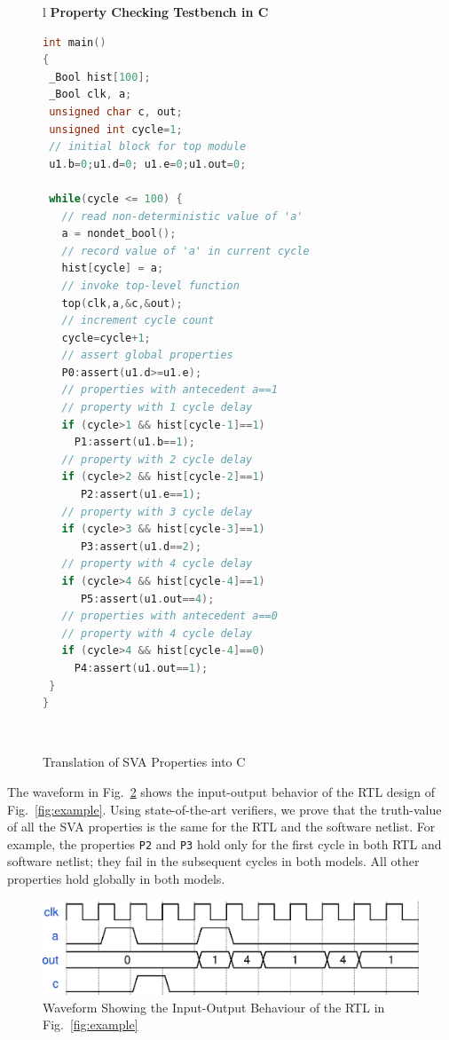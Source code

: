 \begin{figure}[t]
\small
\begin{center}
\begin{tabular}{l}
\hline\noalign{\vskip0.25ex}
\textbf{Property Checking Testbench in C} \\
\hline
\begin{lstlisting}[boxpos=t,mathescape=true,language=C,basicstyle=\scriptsize\ttfamily]
int main() 
{
 _Bool hist[100];
 _Bool clk, a;
 unsigned char c, out;
 unsigned int cycle=1;
 // initial block for top module
 u1.b=0;u1.d=0; u1.e=0;u1.out=0; 
 
 while(cycle <= 100) {
   // read non-deterministic value of 'a'
   a = nondet_bool(); 
   // record value of 'a' in current cycle
   hist[cycle] = a;
   // invoke top-level function
   top(clk,a,&c,&out);
   // increment cycle count
   cycle=cycle+1; 
   // assert global properties 
   P0:assert(u1.d>=u1.e);
   // properties with antecedent a==1 
   // property with 1 cycle delay
   if (cycle>1 && hist[cycle-1]==1) 
     P1:assert(u1.b==1);
   // property with 2 cycle delay
   if (cycle>2 && hist[cycle-2]==1)
      P2:assert(u1.e==1); 
   // property with 3 cycle delay
   if (cycle>3 && hist[cycle-3]==1)
      P3:assert(u1.d==2); 
   // property with 4 cycle delay
   if (cycle>4 && hist[cycle-4]==1)
      P5:assert(u1.out==4); 
   // properties with antecedent a==0
   // property with 4 cycle delay
   if (cycle>4 && hist[cycle-4]==0) 
     P4:assert(u1.out==1);
 }
}
\end{lstlisting}\\
\hline
\end{tabular}
\caption{Translation of SVA Properties into C}
\label{fig:sva}
\end{center}
\end{figure}

The waveform in Fig.\ \ref{intro-waveform} shows the input-output behavior of the RTL design 
of Fig.\ \ref{fig:example}. Using state-of-the-art verifiers, we prove that the truth-value
of all the SVA properties is the same for
the RTL and the software netlist. For example, the properties \texttt{P2} and \texttt{P3} 
hold only for the first cycle in both RTL and software netlist; they fail in the 
subsequent cycles in both models.  All other properties 
hold globally in both models.
%
\begin{figure} 
\begin{center}
  \includegraphics[width=\columnwidth]{figures/example/waveform1.eps}%
	\caption{Waveform Showing the Input-Output Behaviour of the RTL in Fig.~\ref{fig:example}}
\label{intro-waveform}
\end{center}
\end{figure}
%
